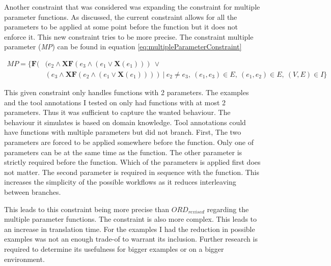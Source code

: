 \documentclass{article}
\begin{document}
Another constraint that was considered was expanding the constraint for multiple parameter functions. As discussed, the current constraint allows for all the parameters to be applied at some point before the function but it does not enforce it. This new constraint tries to be more precise. 
The constraint multiple parameter (\textit{MP}) can be found in equation \ref{eq:multipleParameterConstraint}

\begin{align}
     MP=\{\textbf{F}(& (e_2 \wedge \textbf{XF}(e_3 \wedge (e_1 \vee \textbf{X}(e_1)))\    \vee \nonumber \\
     &(e_3 \wedge \textbf{XF}(e_2 \wedge (e_1 \vee \textbf{X}(e_1)))  ) \ |\ e_2 \not= e_3,\ (e_1,e_3) \in  E ,\ (e_1,e_2) \in  E ,\ (V,E) \in  I\}  \label{eq:multipleParameterConstraint}
\end{align}

This given constraint only handles functions with 2 parameters. The examples and the tool annotations I tested on only had functions with at most 2 parameters. Thus it was sufficient to capture the wanted behaviour. 
The behaviour it simulates is based on domain knowledge. Tool annotations could have functions with multiple parameters but did not branch. First, The two parameters are forced to be applied somewhere before the function. Only one of parameters can be at the same time as the function. The other parameter is strictly required before the function. Which of the parameters is applied first does not matter. The second parameter is required in sequence with the function. This increases the simplicity of the possible workflows as it reduces interleaving between branches. 

This leads to this constraint being more precise than $ORD_{revised}$ regarding the multiple parameter functions. The constraint is also more complex. This leads to an increase in translation time. For the examples I had the reduction in possible examples was not an enough trade-of to warrant its inclusion. Further research is required to determine its usefulness for bigger examples or on a bigger environment. \\


\end{document}
